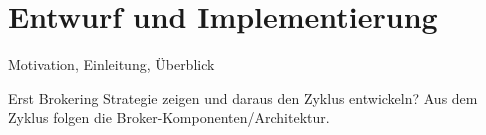 \chapter{Entwurf und Implementierung}
\label{cha:implementierung}

Motivation, Einleitung, Überblick

Erst Brokering Strategie zeigen und daraus den Zyklus entwickeln? Aus dem Zyklus folgen die Broker-Komponenten/Architektur.










